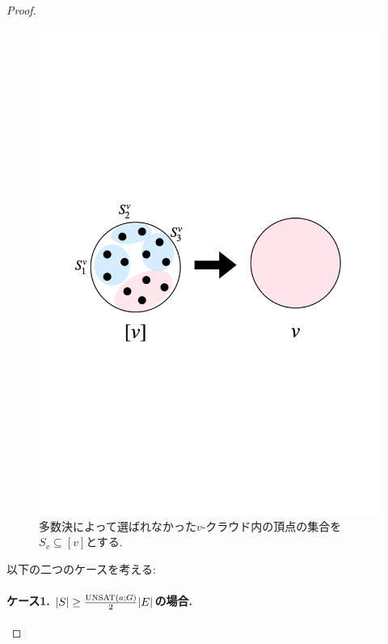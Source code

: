 \begin{proof}
\begin{figure}[ht]
  \centering
  \includegraphics[width=\textwidth]{images/majority_degree_reduction.pdf}
  \caption{多数決によって選ばれなかった$v$-クラウド内の頂点の集合を$S_v\subseteq [v]$とする. \label{fig:majority-degree-reduction}}
\end{figure}

以下の二つのケースを考える:

\paragraph*{ケース1. $\abs{S} \ge \frac{\mathrm{UNSAT}(a;G)}{2}\abs{E}$の場合.}


\end{proof}
